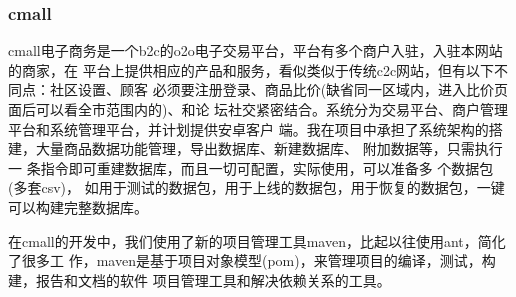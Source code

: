 \subsubsection{cmall}

cmall电子商务是一个b2c的o2o电子交易平台，平台有多个商户入驻，入驻本网站的商家，在
平台上提供相应的产品和服务，看似类似于传统c2c网站，但有以下不同点：社区设置、顾客
必须要注册登录、商品比价(缺省同一区域内，进入比价页面后可以看全市范围内的)、和论
坛社交紧密结合。系统分为交易平台、商户管理平台和系统管理平台，并计划提供安卓客户
端。我在项目中承担了系统架构的搭建，大量商品数据功能管理，导出数据库、新建数据库、
附加数据等，只需执行一 条指令即可重建数据库，而且一切可配置，实际使用，可以准备多
个数据包(多套csv)， 如用于测试的数据包，用于上线的数据包，用于恢复的数据包，一键
可以构建完整数据库。

在cmall的开发中，我们使用了新的项目管理工具maven，比起以往使用ant，简化了很多工
作，maven是基于项目对象模型(pom)，来管理项目的编译，测试，构建，报告和文档的软件
项目管理工具和解决依赖关系的工具。


\newpage
